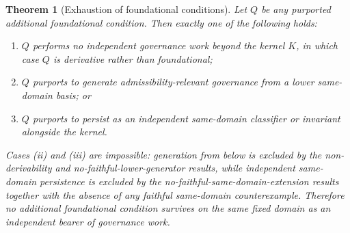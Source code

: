 \documentclass[11pt]{article}
\newtheorem{theorem}{Theorem}[section]
\theoremstyle{definition}
\theoremstyle{remark}
\begin{document}
\begin{theorem}[Exhaustion of foundational conditions]\label{thm:exhaustion-foundational-conditions}
Let $Q$ be any purported additional foundational condition. Then exactly one of the following holds:
\begin{enumerate}[label=(\roman*)]
\item $Q$ performs no independent governance work beyond the kernel $K$, in which case $Q$ is derivative rather than foundational;
\item $Q$ purports to generate admissibility-relevant governance from a lower same-domain basis; or
\item $Q$ purports to persist as an independent same-domain classifier or invariant alongside the kernel.
\end{enumerate}
Cases (ii) and (iii) are impossible: generation from below is excluded by the non-derivability and no-faithful-lower-generator results, while independent same-domain persistence is excluded by the no-faithful-same-domain-extension results together with the absence of any faithful same-domain counterexample. Therefore no additional foundational condition survives on the same fixed domain as an independent bearer of governance work.
\end{theorem}
\end{document}
